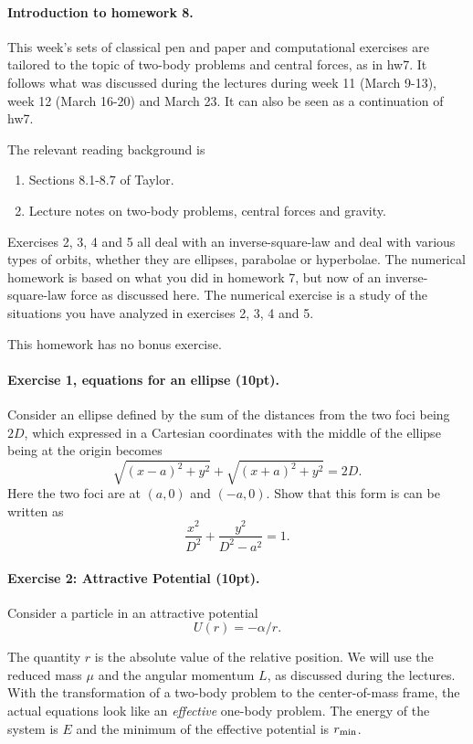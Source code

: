 \documentclass[%
oneside,                 %
final,                   %
10pt]{article}
\begin{document}
\noindent
\paragraph{Introduction to homework 8.}
This week's sets of classical pen and paper and computational
exercises are tailored to the topic of two-body problems and central
forces, as in hw7. It follows what was discussed during the lectures during week
11 (March 9-13), week 12 (March 16-20) and March 23. It can also be seen as a continuation of hw7. 

The relevant reading background is
\begin{enumerate}
\item Sections 8.1-8.7 of Taylor.

\item Lecture notes on two-body problems, central forces and gravity.
\end{enumerate}

\noindent
Exercises 2, 3, 4 and 5 all deal with an inverse-square-law and deal with various types of orbits, whether they are ellipses, parabolae or hyperbolae. 
The numerical homework is based on what you did in homework 7, but now of an inverse-square-law force as discussed here.  The numerical exercise is a study of the situations you have analyzed in exercises 2, 3, 4 and 5.

This homework has no bonus exercise.



\paragraph{Exercise 1, equations for an ellipse (10pt).}
Consider an ellipse defined by the sum of the distances from the two foci being $2D$, which expressed in a Cartesian coordinates with the middle of the ellipse being at the origin becomes
\[
\sqrt{(x-a)^2+y^2}+\sqrt{(x+a)^2+y^2}=2D.
\]
Here the two foci are at $(a,0)$ and $(-a,0)$. Show that this form is can be written as
\[
\frac{x^2}{D^2}+\frac{y^2}{D^2-a^2}=1.
\]

\paragraph{Exercise 2: Attractive Potential (10pt).}
Consider a particle in an attractive potential
\[
U(r)=-\alpha/r.
\]

The quantity $r$ is the absolute value of the relative position. We
will use the reduced mass $\mu$ and the angular momentum $L$, as
discussed during the lectures. With the transformation of a two-body
problem to the center-of-mass frame, the actual equations look like an
\emph{effective} one-body problem. The energy of the system is $E$ and the
minimum of the effective potential is $r_{\rm min}$.
\end{document}
